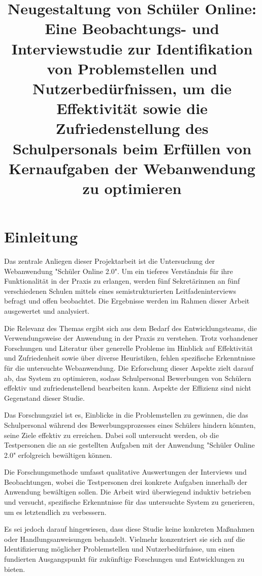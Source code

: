 \title{Neugestaltung von Schüler Online: Eine Beobachtungs- und Interviewstudie zur Identifikation von Problemstellen und Nutzerbedürfnissen, um die Effektivität sowie die Zufriedenstellung des Schulpersonals beim Erfüllen von Kernaufgaben der Webanwendung zu optimieren}

\section{Einleitung}

Das zentrale Anliegen dieser Projektarbeit ist die Untersuchung der Webanwendung "Schüler Online 2.0". Um ein tieferes Verständnis für ihre Funktionalität in der Praxis zu erlangen, werden fünf Sekretärinnen an fünf verschiedenen Schulen mittels eines semistrukturierten Leitfadeninterviews befragt und offen beobachtet. Die Ergebnisse werden im Rahmen dieser Arbeit ausgewertet und analysiert.

Die Relevanz des Themas ergibt sich aus dem Bedarf des Entwicklungsteams, die Verwendungsweise der Anwendung in der Praxis zu verstehen. Trotz vorhandener Forschungen und Literatur über generelle Probleme im Hinblick auf Effektivität und Zufriedenheit sowie über diverse Heuristiken, fehlen spezifische Erkenntnisse für die untersuchte Webanwendung. Die Erforschung dieser Aspekte zielt darauf ab, das System zu optimieren, sodass Schulpersonal Bewerbungen von Schülern effektiv und zufriedenstellend bearbeiten kann. Aspekte der Effizienz sind nicht Gegenstand dieser Studie.

Das Forschungsziel ist es, Einblicke in die Problemstellen zu gewinnen, die das Schulpersonal während des Bewerbungsprozesses eines Schülers hindern könnten, seine Ziele effektiv zu erreichen. Dabei soll untersucht werden, ob die Testpersonen die an sie gestellten Aufgaben mit der Anwendung "Schüler Online 2.0" erfolgreich bewältigen können. 

Die Forschungsmethode umfasst qualitative Auswertungen der Interviews und Beobachtungen, wobei die Testpersonen drei konkrete Aufgaben innerhalb der Anwendung bewältigen sollen. Die Arbeit wird überwiegend induktiv betrieben und versucht, spezifische Erkenntnisse für das untersuchte System zu generieren, um es letztendlich zu verbessern.

Es sei jedoch darauf hingewiesen, dass diese Studie keine konkreten Maßnahmen oder Handlungsanweisungen behandelt. Vielmehr konzentriert sie sich auf die Identifizierung möglicher Problemstellen und Nutzerbedürfnisse, um einen fundierten Ausgangspunkt für zukünftige Forschungen und Entwicklungen zu bieten.

